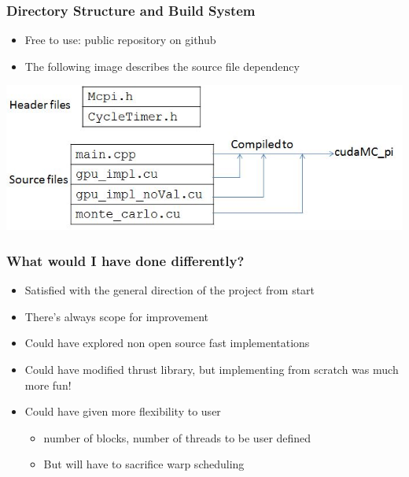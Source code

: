 \documentclass[mathserif]{beamer}
\begin{document}
\begin{frame}                                                                                                                                                                          
\frametitle{Directory Structure and Build System}
\begin{center}
\begin{itemize}
\item Free to use: public repository on github
\item The following image describes the source file dependency 
\end{itemize}
\end{center}
\begin{center}
\includegraphics[scale=0.5]{dir.JPG}
\end{center}
\end{frame}             

\begin{frame}                                                                                                                                                                          
\frametitle{What would I have done differently?}
\begin{center}
\begin{itemize}
\item Satisfied with the general direction of the project from start
\item There's always scope for improvement
\item Could have explored non open source fast implementations 
\item Could have modified thrust library, but implementing from scratch was much more fun!
\item Could have given more flexibility to user 
\begin{itemize}
\item number of blocks, number of threads to be user defined         
\item But will have to sacrifice warp scheduling  
\end{itemize}
\end{itemize}
\end{center}
\end{frame}             
\end{document}
